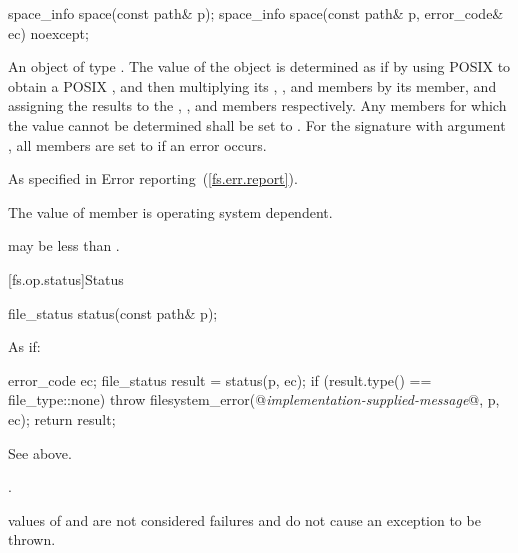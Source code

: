 \begin{itemdecl}
space_info space(const path& p);
space_info space(const path& p, error_code& ec) noexcept;
\end{itemdecl}

\begin{itemdescr}
\pnum
\returns An object of type . The value of the 
  object is determined as if by using POSIX 
  to obtain a POSIX ,
  and then multiplying its , ,
  and  members by its  member,
  and assigning the results to the , ,
  and  members respectively. Any members for which the
  value cannot be determined shall be set to .
  For the signature with argument , all members are set to
   if an error occurs.

\pnum
\throws As specified in Error reporting~(\ref{fs.err.report}).

\pnum
\remarks The value of member 
      is operating system dependent. \begin{note}  may be
      less than . \end{note}
\end{itemdescr}


[fs.op.status]{Status}

\begin{itemdecl}
file_status status(const path& p);
\end{itemdecl}

\begin{itemdescr}
\pnum
\effects As if:
\begin{codeblock}
error_code ec;
file_status result = status(p, ec);
if (result.type() == file_type::none)
  throw filesystem_error(@\textit{implementation-supplied-message}@, p, ec);
return result;
\end{codeblock}

\pnum
\returns See above.

\pnum
\throws {}.
\begin{note}  values of 
  and  are not considered failures and do not
  cause an exception to be thrown.\end{note}
\end{itemdescr}

